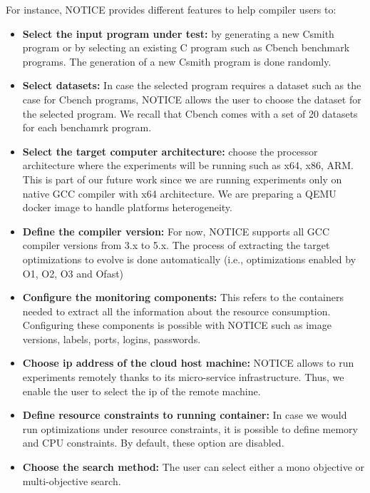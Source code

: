 For instance, NOTICE provides different features to help compiler users to:
\begin{itemize} 
	
	
	\item \textbf{Select the input program under test:} by generating a new Csmith program or by selecting an existing C program such as Cbench benchmark programs. The generation of a new Csmith program is done randomly.
	
	\item \textbf{Select datasets:} In case the selected program requires a dataset such as the case for Cbench programs, NOTICE allows the user to choose the dataset for the selected program. We recall that Cbench comes with a set of 20 datasets for each benchamrk program.
	
	\item \textbf{Select the target computer architecture:} choose the processor architecture where the experiments will be running such as x64, x86, ARM. This is part of our future work since we are running experiments only on native GCC compiler with x64 architecture. We are preparing a QEMU docker image to handle platforms heterogeneity.
	
	\item \textbf{Define the compiler version:} For now, NOTICE supports all GCC compiler versions from 3.x to 5.x. The process of extracting the target optimizations to evolve is done automatically (i.e., optimizations enabled by O1, O2, O3 and Ofast)
	
	\item \textbf{Configure the monitoring components:} This refers to the containers needed to extract all the information about the resource consumption. Configuring these components is possible with NOTICE such as image versions, labels, ports, logins, passwords.
	
	\item \textbf{Choose ip address of the cloud host machine:} NOTICE allows to run experiments remotely thanks to its micro-service infrastructure. Thus, we enable the user to select the ip of the remote machine.
	
	\item \textbf{Define resource constraints to running container:} In case we would run optimizations under resource constraints, it is possible to define memory and CPU constraints. By default, these option are disabled.
	
	\item \textbf{Choose the search method:} The user can select either a mono objective or multi-objective search.
	

\end{itemize}
